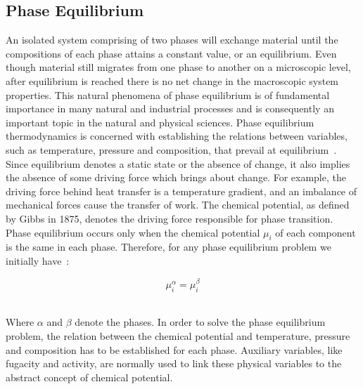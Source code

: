 \subsection{Phase Equilibrium}
An isolated system comprising of two phases will exchange material until the compositions of each phase attains a constant value, or an equilibrium. Even though material still migrates from one phase to another on a microscopic level, after equilibrium is reached there is no net change in the macroscopic system properties. This natural phenomena of phase equilibrium is of fundamental importance in many natural and industrial processes and is consequently an important topic in the natural and physical sciences. Phase equilibrium thermodynamics is concerned with establishing the relations between variables, such as temperature, pressure and composition, that prevail at equilibrium~\cite{MolecularThermodynamicsOfFluidPhaseEquilibria, SmithNessAbbott}.\\

Since equilibrium denotes a static state or the absence of change, it also implies the absence of some driving force which brings about change. For example, the driving force behind heat transfer is a temperature gradient, and an imbalance of mechanical forces cause the transfer of work. The chemical potential, as defined by Gibbs in 1875, denotes the driving force responsible for phase transition. Phase equilibrium occurs only when the chemical potential $\mu_{i}$ of each component is the same in each phase. Therefore, for any phase equilibrium problem we initially have~\cite{MolecularThermodynamicsOfFluidPhaseEquilibria}:\

\begin{equation}
\mu_{i}^{\alpha} = \mu_{i}^{\beta}
\end{equation}\

Where $\alpha$ and $\beta$ denote the phases. In order to solve the phase equilibrium problem, the relation between the chemical potential and temperature, pressure and composition has to be established for each phase. Auxiliary variables, like fugacity and activity, are normally used to link these physical variables to the abstract concept of chemical potential.\


